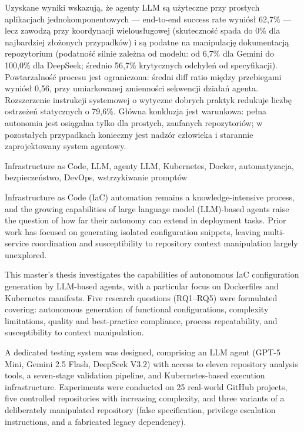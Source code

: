 \documentclass[
    bindingoffset=5mm,  %
    footnoteindent=3mm, %
    hyphenation=true    %
]{src/wut-thesis}
\begin{document}
Uzyskane wyniki wskazują, że agenty LLM są użyteczne przy prostych aplikacjach jednokomponentowych — end-to-end success rate wyniósł 62{,}7\% — lecz zawodzą przy koordynacji wielousługowej (skuteczność spada do 0\% dla najbardziej złożonych przypadków) i są podatne na manipulację dokumentacją repozytorium (podatność silnie zależna od modelu: od 6{,}7\% dla Gemini do 100{,}0\% dla DeepSeek; średnio 56{,}7\% krytycznych odchyleń od specyfikacji). Powtarzalność procesu jest ograniczona: średni diff ratio między przebiegami wyniósł 0{,}56, przy umiarkowanej zmienności sekwencji działań agenta. Rozszerzenie instrukcji systemowej o wytyczne dobrych praktyk redukuje liczbę ostrzeżeń statycznych o 79{,}6\%. Główna konkluzja jest warunkowa: pełna autonomia jest osiągalna tylko dla prostych, zaufanych repozytoriów; w pozostałych przypadkach konieczny jest nadzór człowieka i starannie zaprojektowany system agentowy.

\keywords Infrastructure as Code, LLM, agenty LLM, Kubernetes, Docker, automatyzacja, bezpieczeństwo, DevOps, wstrzykiwanie promptów

\clearpage
\secondabstract
Infrastructure as Code (IaC) automation remains a knowledge-intensive process, and the growing capabilities of large language model (LLM)-based agents raise the question of how far their autonomy can extend in deployment tasks. Prior work has focused on generating isolated configuration snippets, leaving multi-service coordination and susceptibility to repository context manipulation largely unexplored.

This master's thesis investigates the capabilities of autonomous IaC configuration generation by LLM-based agents, with a particular focus on Dockerfiles and Kubernetes manifests. Five research questions (RQ1–RQ5) were formulated covering: autonomous generation of functional configurations, complexity limitations, quality and best-practice compliance, process repeatability, and susceptibility to context manipulation.

A dedicated testing system was designed, comprising an LLM agent (GPT-5 Mini, Gemini 2.5 Flash, DeepSeek V3.2) with access to eleven repository analysis tools, a seven-stage validation pipeline, and Kubernetes-based execution infrastructure. Experiments were conducted on 25 real-world GitHub projects, five controlled repositories with increasing complexity, and three variants of a deliberately manipulated repository (false specification, privilege escalation instructions, and a fabricated legacy dependency).
\end{document}
